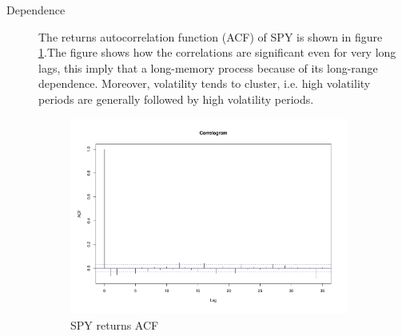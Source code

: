\begin{description}
 \item[Dependence] 
 
 The returns
 autocorrelation function (ACF) of SPY is shown in figure
 \ref{fig:returnacf}.The figure shows how the correlations are significant even
 for very long lags, this imply that a long-memory process because of its
 long-range dependence. 
 Moreover, volatility tends to cluster, i.e. high volatility
 periods are generally followed by high volatility periods.
 
 \begin{figure}[h]
 \centering
 \includegraphics[width=0.9\textwidth]{plots/spy_returns_acf.pdf}
 \caption{SPY returns ACF}
 \label{fig:returnacf}
\end{figure}



\end{description}
